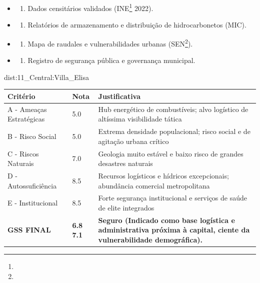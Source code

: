 {\begin{itemize}
\tightlist
\item
  \begin{enumerate}
  \def\labelenumi{\arabic{enumi})}
  \tightlist
  \item
    Dados censitários validados (INE\footnote{\fineINE} 2022).
  \end{enumerate}
\item
  \begin{enumerate}
  \def\labelenumi{\arabic{enumi})}
  \setcounter{enumi}{1}
  \tightlist
  \item
    Relatórios de armazenamento e distribuição de hidrocarbonetos (MIC).
  \end{enumerate}
\item
  \begin{enumerate}
  \def\labelenumi{\arabic{enumi})}
  \setcounter{enumi}{2}
  \tightlist
  \item
    Mapa de raudales e vulnerabilidades urbanas (SEN\footnote{\fineSEN}).
  \end{enumerate}
\item
  \begin{enumerate}
  \def\labelenumi{\arabic{enumi})}
  \setcounter{enumi}{3}
  \tightlist
  \item
    Registro de segurança pública e governança municipal.
  \end{enumerate}
\end{itemize}}{dist:11_Central:Villa_Elisa}
\begin{table}[ht!]
\small \begin{tabular}{p{3.0cm}p{0.8cm}p{6.0cm}} \toprule
\textbf{Critério} & \textbf{Nota} & \textbf{Justificativa} \\ \midrule
A - Ameaças Estratégicas & 5.0 & Hub energético de combustíveis; alvo logístico de altíssima visibilidade tática \\
B - Risco Social & 5.0 & Extrema densidade populacional; risco social e de agitação urbana crítico \\
C - Riscos Naturais & 7.0 & Geologia muito estável e baixo risco de grandes desastres naturais \\
D - Autossuficiência & 8.5 & Recursos logísticos e hídricos excepcionais; abundância comercial metropolitana \\
E - Institucional & 8.5 & Forte segurança institucional e serviços de saúde de elite integrados \\
\midrule \textbf{GSS FINAL} & \textbf{6.8
7.1} & \textbf{Seguro (Indicado como base logística e administrativa próxima à capital, ciente da vulnerabilidade demográfica).} \\ \bottomrule \end{tabular}
\end{table}

